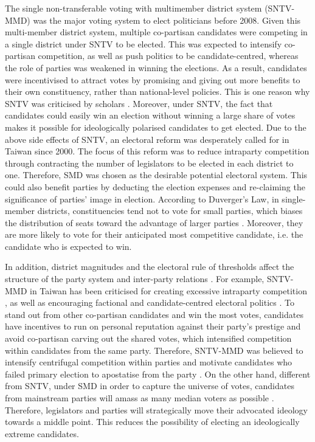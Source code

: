 The single non-transferable voting with multimember district system (SNTV-MMD) was the major voting system to elect politicians before 2008. Given this multi-member district system, multiple co-partisan candidates were competing in a single district under SNTV to be elected. This was expected to intensify co-partisan competition, as well as push politics to be candidate-centred, whereas the role of parties was weakened in winning the elections. As a result, candidates were incentivised to attract votes by promising and giving out more benefits to their own constituency, rather than national-level policies. This is one reason why SNTV was criticised by scholars \citep[e.g.][]{Wu2003, Batto2016}. Moreover, under SNTV, the fact that candidates could easily win an election without winning a large share of votes makes it possible for ideologically polarised candidates to get elected. Due to the above side effects of SNTV, an electoral reform was desperately called for in Taiwan since 2000. The focus of this reform was to reduce intraparty competition through contracting the number of legislators to be elected in each district to one. Therefore, SMD was chosen as the desirable potential electoral system. This could also benefit parties by deducting the election expenses and re-claiming the significance of parties' image in election. According to Duverger's Law, in single-member districts, constituencies tend not to vote for small parties, which biases the distribution of seats toward the advantage of larger parties \citep[][]{Reed2001, Duverger1954}. Moreover, they are more likely to vote for their anticipated most competitive candidate, i.e. the candidate who is expected to win. 

In addition, district magnitudes and the electoral rule of thresholds affect the structure of the party system and inter-party relations \citep{Duverger1954}. For example, SNTV-MMD in Taiwan has been criticised for creating excessive intraparty competition \citep[e.g.,][]{Hirano2006}, as well as encouraging factional and candidate-centred electoral politics \citep{Batto2016, Wu2003, Cox1993b, Cox1996b, Cox1997a}. To stand out from other co-partisan candidates and win the most votes, candidates have incentives to run on personal reputation against their party's prestige and avoid co-partisan carving out the shared votes, which intensified competition within candidates from the same party. Therefore, SNTV-MMD was believed to intensify centrifugal competition \citep{Cox1990, Carey1995} within parties and motivate candidates who failed primary election to apostatise from the party \citep{Wu2003}. On the other hand, different from SNTV, under SMD in order to capture the universe of votes, candidates from mainstream parties will amass as many median voters as possible \citep{Downs1957, Duverger1954, Magar1998, Merrill2002}.  Therefore, legislators and parties will strategically move their advocated ideology towards a middle point. This reduces the possibility of electing an ideologically extreme candidates. 

